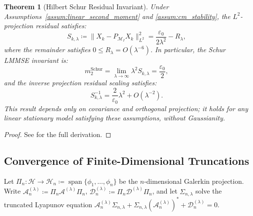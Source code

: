 \documentclass[11pt]{amsart}
\theoremstyle{plain}
\newtheorem{theorem}{Theorem}
\theoremstyle{definition}
\theoremstyle{remark}
\begin{document}
    \begin{theorem}[Hilbert Schur Residual Invariant]
        \label{thm:inf_cancellation}
        Under Assumptions~\ref{assum:linear_second_moment} and \ref{assum:cm_stability}, the $L^2$-projection residual satisfies:
        \begin{equation}
            \label{eq:main_schur_sharp}
            S_{k,\lambda} \coloneqq \|X_k - P_{\mathcal{M}_I} X_k\|_{L^2}^2 = \frac{\varepsilon_0}{2\lambda^2} - R_\lambda,
        \end{equation}
        where the remainder satisfies $0 \le R_\lambda = O(\lambda^{-6})$. In particular, the Schur LMMSE invariant is:
        \begin{equation}
            \label{eq:m2_schur_value}
            m_2^{\mathrm{Schur}} = \lim_{\lambda\to\infty} \lambda^2 S_{k,\lambda} = \frac{\varepsilon_0}{2},
        \end{equation}
        and the inverse projection residual scaling satisfies:
        \begin{equation}
            \label{eq:schur_scaling_inverse}
            S_{k,\lambda}^{-1} = \frac{2}{\varepsilon_0}\lambda^2 + O(\lambda^{-2}).
        \end{equation}
        This result depends only on covariance and orthogonal projection; it holds for any linear stationary model satisfying these assumptions, without Gaussianity.
    \end{theorem}
    \begin{proof}
        See  for the full derivation.
    \end{proof}

    \subsection{Convergence of Finite-Dimensional Truncations}
    \label{sec:proofs:convergence}

    Let $\Pi_n: \mathcal{H} \to \mathcal{H}_n \coloneqq \operatorname{span}\{\phi_1, \ldots, \phi_n\}$ be the $n$-dimensional Galerkin projection. Write $\mathcal{A}_n^{(\lambda)} \coloneqq \Pi_n \mathcal{A}^{(\lambda)} \Pi_n$, $\mathcal{D}_n^{(\lambda)} \coloneqq \Pi_n \mathcal{D}^{(\lambda)} \Pi_n$, and let $\Sigma_{n,\lambda}$ solve the truncated Lyapunov equation $\mathcal{A}_n^{(\lambda)} \Sigma_{n,\lambda} + \Sigma_{n,\lambda} (\mathcal{A}_n^{(\lambda)})^* + \mathcal{D}_n^{(\lambda)} = 0$.
\end{document}
